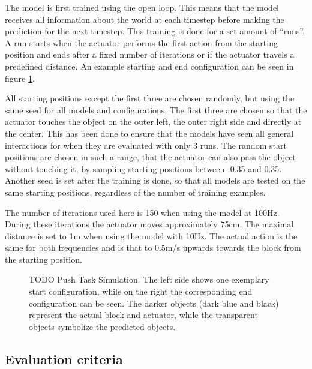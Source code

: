 The model is first trained using the open loop. This means that the model receives all information about the
world at each timestep before making the prediction for the next timestep. This training is done for a set amount
of \enquote{runs}. A run starts when the actuator performs the first action from the starting position and ends after a fixed 
number of iterations or if the actuator travels a predefined distance.
An example starting and end configuration can be seen in figure \ref{fig:pushTaskSim}. 

All starting positions except the first three are chosen randomly, but using the
same seed for all models and configurations. %
The first three are chosen so that the actuator touches the object on the outer left, the outer right side
and directly at the center. This has been done to ensure that the models have seen all general interactions for when they are evaluated with only 3
runs. The random start positions are chosen in such a range, that the actuator can also pass the object without touching it, by sampling starting positions
between -0.35 and 0.35. Another seed is set after the training is done, so that all models are tested on the same starting positions, regardless of
the number of training examples.

The number of iterations used here is 150 when using
the model at 100Hz. During these iterations the actuator moves approximately 75cm. The maximal distance is set to 1m when using the
model with 10Hz. The actual action is the same for both frequencies and is that to 0.5m/s upwards towards the block from the starting
position. 

\begin{figure}
	
	\caption{TODO Push Task Simulation. The left side shows one exemplary start configuration, while on the right the corresponding end configuration can be seen.
		The darker objects (dark blue and black) represent the actual block and actuator, while the transparent objects symbolize the predicted objects.}
	\label{fig:pushTaskSim}
\end{figure}


\subsection{Evaluation criteria}

